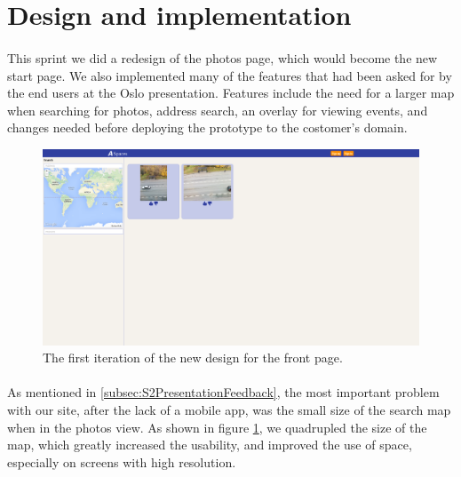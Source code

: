 \section{Design and implementation}
\label{sec:S5DesignImpl}

\paragraph{} This sprint we did a redesign of the photos page, which would become the new start page. We also implemented many of the features that had been asked for by the end users at the Oslo presentation. Features include the need for a larger map when searching for photos, address search, an overlay for viewing events, and changes needed before deploying the prototype to the costomer's domain.

\begin{figure}[ht!]
  \centering
  \includegraphics[width=\linewidth]{./img/webpage/27Oct/Frontpage27Oct}
  \caption{The first iteration of the new design for the front page.}
  \label{fig:S5DesignImplFront27Oct}
\end{figure}

\paragraph{} As mentioned in \ref{subsec:S2PresentationFeedback}, the most important problem with our site, after the lack of a mobile app, was the small size of the search map when in the photos view. As shown in figure \ref{fig:S5DesignImplFront27Oct}, we quadrupled the size of the map, which greatly increased the usability, and improved the use of space, especially on screens with high resolution.

